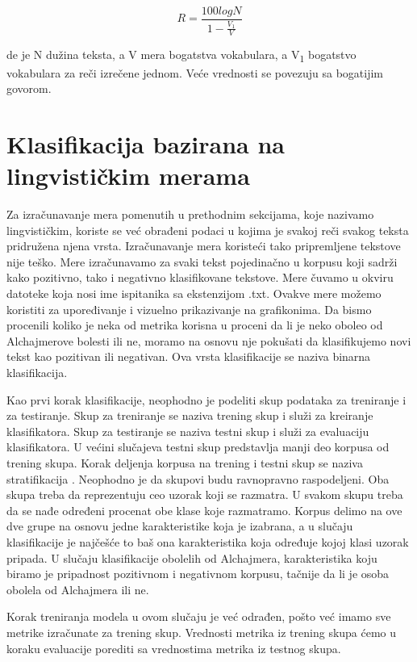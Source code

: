 \documentclass[12pt,oneside]{memoir}
\begin{document}
\begin{equation}
	R = \frac{100logN}{1 - \frac{V_1}{V}}
\end{equation}

de je N dužina teksta, a V mera bogatstva vokabulara, a V\textsubscript{1} bogatstvo vokabulara za reči izrečene jednom.  Veće vrednosti se povezuju sa bogatijim govorom.  

\section{Klasifikacija bazirana na lingvističkim merama}

Za izračunavanje mera pomenutih u prethodnim sekcijama,  koje nazivamo lingvističkim,  koriste se već obrađeni podaci u kojima je svakoj reči svakog teksta pridružena njena vrsta.  Izračunavanje mera koristeći tako pripremljene tekstove nije teško.  Mere izračunavamo za svaki tekst pojedinačno u korpusu koji sadrži kako pozitivno, tako i negativno klasifikovane tekstove.  Mere čuvamo u okviru datoteke koja nosi ime ispitanika sa ekstenzijom .txt. Ovakve mere možemo koristiti za upoređivanje i vizuelno prikazivanje na grafikonima. Da bismo procenili koliko je neka od metrika korisna u proceni da li je neko oboleo od Alchajmerove bolesti ili ne,  moramo na osnovu nje pokušati da klasifikujemo novi tekst kao pozitivan ili negativan.  Ova vrsta klasifikacije se naziva binarna klasifikacija. 

Kao prvi korak klasifikacije,  neophodno je podeliti skup podataka za treniranje i za testiranje.  Skup za treniranje se naziva trening skup i služi za kreiranje klasifikatora.  Skup za testiranje se naziva testni skup i služi za evaluaciju klasifikatora. U većini slučajeva testni skup predstavlja manji deo korpusa od trening skupa.  Korak deljenja korpusa na trening i testni skup se naziva stratifikacija \cite{MarijaMR}.   Neophodno je da skupovi budu ravnopravno raspodeljeni.  Oba skupa treba da reprezentuju ceo uzorak koji se razmatra. U svakom skupu treba da se nađe određeni procenat obe klase koje razmatramo.  Korpus delimo na ove dve grupe na osnovu jedne karakteristike koja je izabrana, a u slučaju klasifikacije je najčešće to baš ona karakteristika koja određuje kojoj klasi uzorak pripada.  U slučaju klasifikacije obolelih od Alchajmera, karakteristika koju biramo je pripadnost pozitivnom i negativnom korpusu, tačnije da li je osoba obolela od Alchajmera ili ne.  

Korak treniranja modela u ovom slučaju je već odrađen, pošto već imamo sve metrike izračunate za trening skup. Vrednosti metrika iz trening skupa ćemo u koraku evaluacije porediti sa vrednostima metrika iz testnog skupa.
\end{document}
